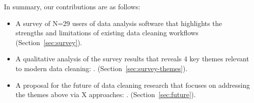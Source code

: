 In summary, our contributions are as follows:
\begin{itemize}
\item A survey of N=29 users of data analysis software that highlights the strengths and limitations of existing data cleaning workflows (Section~\ref{sec:survey}).
\item A qualitative analysis of the survey results that reveals 4 key themes relevant to modern data cleaning: . (Section~\ref{sec:survey-themes}).
\item A proposal for the future of data cleaning research that focuses on addressing the themes above via X approaches: .  (Section~\ref{sec:future}).
\end{itemize}

